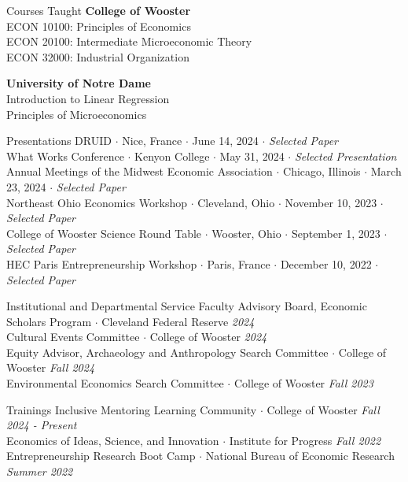 \documentclass{resume} %
\begin{document}

\begin{rSection}{Courses Taught}
	{\bf College of Wooster}  \\ 
	ECON 10100: Principles of Economics \\
	ECON 20100: Intermediate Microeconomic Theory \\
	ECON 32000: Industrial Organization

	{\bf University of Notre Dame}  \\ 
	Introduction to Linear Regression \\
    Principles of Microeconomics
\end{rSection}

\newpage
\begin{rSection}{Presentations}
DRUID $\cdot$ Nice, France $\cdot$ June 14, 2024 $\cdot$ \textit{Selected Paper} \\
What Works Conference $\cdot$ Kenyon College $\cdot$ May 31, 2024 $\cdot$ \textit{Selected Presentation} \\
Annual Meetings of the Midwest Economic Association $\cdot$ Chicago, Illinois $\cdot$ March 23, 2024 $\cdot$ \textit{Selected Paper} \\
Northeast Ohio Economics Workshop $\cdot$ Cleveland, Ohio $\cdot$ November 10, 2023 $\cdot$ \textit{Selected Paper} \\
College of Wooster Science Round Table $\cdot$ Wooster, Ohio $\cdot$ September 1, 2023 $\cdot$ \textit{Selected Paper} \\
HEC Paris Entrepreneurship Workshop $\cdot$ Paris, France $\cdot$ December 10, 2022 $\cdot$ \textit{Selected Paper} 
\end{rSection}

\begin{rSection}{Institutional and Departmental Service}
	Faculty Advisory Board, Economic Scholars Program $\cdot$ Cleveland Federal Reserve \hfill {\em 2024} \\
	Cultural Events Committee $\cdot$ College of Wooster \hfill {\em 2024} \\
	Equity Advisor, Archaeology and Anthropology Search Committee $\cdot$ College of Wooster \hfill {\em Fall 2024} \\
	Environmental Economics Search Committee $\cdot$ College of Wooster \hfill {\em Fall 2023}
\end{rSection}

\begin{rSection}{Trainings}
	Inclusive Mentoring Learning Community $\cdot$ College of Wooster \hfill {\em Fall 2024 - Present} \\
	Economics of Ideas, Science, and Innovation $\cdot$ Institute for Progress  \hfill {\em Fall 2022} \\
	Entrepreneurship Research Boot Camp $\cdot$ National Bureau of Economic Research \hfill {\em Summer 2022}
\end{rSection}
\end{document}
